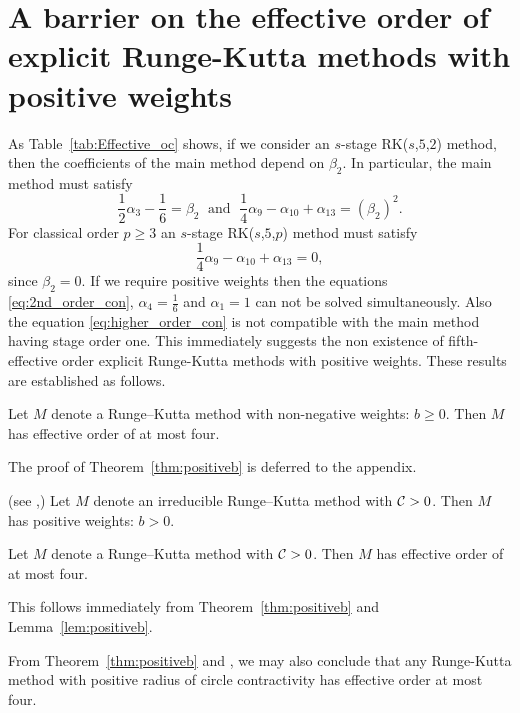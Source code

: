 \section{A barrier on the effective order of explicit Runge-Kutta methods with positive weights}\label{sec:ExRK_barrier}

\indent As Table~\ref{tab:Effective_oc} shows, if we consider an $s$-stage RK($s$,$5$,$2$) method, then the coefficients of the main method depend on $\beta_2$. In particular, the main method must satisfy
\begin{equation}\label{eq:2nd_order_con}
    \frac{1}{2}\alpha_3 - \frac{1}{6} = \beta_2 \; \text{ and } \; \frac{1}{4}\alpha_9 - \alpha_{10} + \alpha_{13} = (\beta_2)^2.
\end{equation}
For classical order $p \geq 3$ an $s$-stage RK($s$,$5$,$p$) method must satisfy
\begin{equation}\label{eq:higher_order_con}
    \frac{1}{4}\alpha_9- \alpha_{10} + \alpha_{13} = 0,
\end{equation}
since $\beta_2 = 0$.
If we require positive weights then the equations \eqref{eq:2nd_order_con},
$\alpha_4 = \frac{1}{6}$ and $\alpha_1 = 1$ can not be solved simultaneously.
Also the equation \eqref{eq:higher_order_con} is not compatible with the main method having stage order one.
This immediately suggests the non existence of fifth-effective order explicit Runge-Kutta methods with positive weights.
These results are established as follows.

\begin{theorem}\label{thm:positiveb}
    Let $M$ denote a Runge--Kutta method with non-negative weights: $b\ge 0$.
    Then $M$ has effective order of at most four.
\end{theorem}
The proof of Theorem~\ref{thm:positiveb} is deferred to the appendix.

\begin{lemma}\label{lem:positiveb}(see \cite[Theorem~4.2]{Kraaijevanger1991},\cite[Lemma 4.2]{Ruuth2002})
Let $M$ denote an irreducible Runge--Kutta method with $\mathcal{C}>0$.  Then $M$ has positive weights:
$b>0$.
\end{lemma}

\begin{corollary}\label{cor:no-ssp-5}
    Let $M$ denote a Runge--Kutta method with $\mathcal{C}>0$.
    Then $M$ has effective order of at most four.
\end{corollary}
This follows immediately from Theorem~\ref{thm:positiveb} and Lemma~\ref{lem:positiveb}.

\begin{remark}
  From Theorem~\ref{thm:positiveb} and \cite[Theorem~4.1]{dahlquist2006}, we
  may also conclude that any Runge-Kutta method with positive radius of circle contractivity
  has effective order at most four.
\end{remark}


